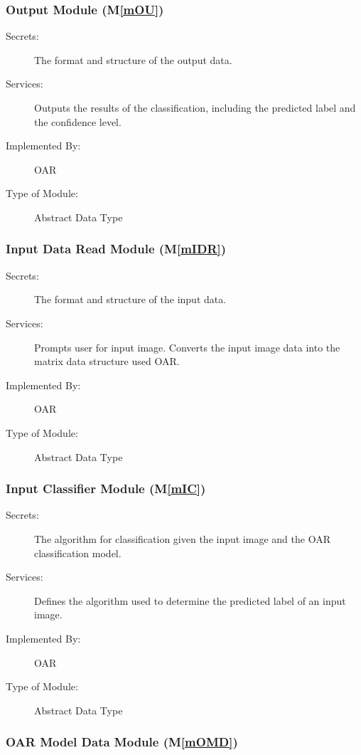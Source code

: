 \documentclass[12pt, titlepage]{article}
\newcommand{\mref}[1]{M\ref{#1}}
\begin{document}
\subsubsection{Output Module (\mref{mOU})}

\begin{description}
\item[Secrets:] The format and structure of the output data.
\item[Services:] Outputs the results of the classification, including the predicted label and the confidence level.
\item[Implemented By:] OAR
\item[Type of Module:] Abstract Data Type
\end{description}

\subsubsection{Input Data Read Module (\mref{mIDR})}

\begin{description}
\item[Secrets:] The format and structure of the input data.
\item[Services:] Prompts user for input image. Converts the input image data into the matrix data structure used OAR.
\item[Implemented By:] OAR
\item[Type of Module:] Abstract Data Type
\end{description}

\subsubsection{Input Classifier Module (\mref{mIC})}

\begin{description}
\item[Secrets:] The algorithm for classification given the input image and the OAR classification model.
\item[Services:] Defines the algorithm used to determine the predicted label of an input image.
\item[Implemented By:] OAR
\item[Type of Module:] Abstract Data Type
\end{description}

\subsubsection{OAR Model Data Module (\mref{mOMD})}
\end{document}
